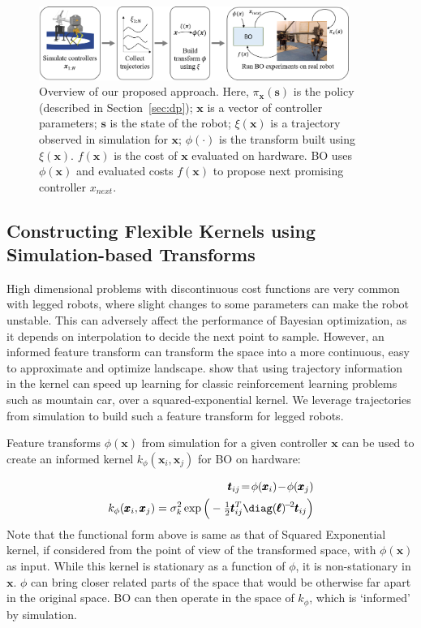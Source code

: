 \begin{figure}
    \centering
    \includegraphics[width=0.9\textwidth]{img/approach.png}
    \caption{Overview of our proposed approach. Here, $\pi_{\pmb{x}}(\pmb{s})$ is the policy (described in Section~\ref{sec:dp});  $\pmb{x}$ is a vector of controller parameters; $\pmb{s}$ is the state of the robot; $\xi(\pmb{x})$ is a trajectory observed in simulation for $\pmb{x}$; $\phi(\cdot)$ is the transform built using $\xi(\pmb{x})$. $f(\pmb{x})$ is the cost of $\pmb{x}$ evaluated on hardware. BO uses $\phi(\pmb{x})$ and evaluated costs $f(\pmb{x})$ to propose next promising controller $x_{next}$. }
    \label{fig:approach}
\end{figure}

\subsection{Constructing Flexible Kernels using Simulation-based Transforms}

High dimensional problems with discontinuous cost functions are very common with legged robots, where slight changes to some parameters can make the robot unstable. This can adversely affect the performance of Bayesian optimization, as it depends on interpolation to decide the next point to sample. However, an informed feature transform can transform the space into a more continuous, easy to approximate and optimize landscape. \cite{wilson2014using} show that using trajectory information in the kernel can speed up learning for classic reinforcement learning problems such as mountain car, over a squared-exponential kernel. We leverage trajectories from simulation to build such a feature transform for legged robots.

Feature transforms $\phi(\pmb{x})$ from simulation for a given controller $\pmb{x}$ can be used to create an informed kernel $k_{\phi}(\pmb{x}_i, \pmb{x}_j)$ for BO on hardware:

\begin{align}
    \pmb{t}_{ij} \!=\! \phi(\pmb{x}_i) \!-\! \phi(\pmb{x}_j) \\
    k_{\phi}(\pmb{x}_i, \pmb{x}_j) = \sigma_k^2 \exp\Big(- \tfrac{1}{2} \pmb{t}_{ij}^T  \diag(\pmb{\ell})^{\!-\!2} \pmb{t}_{ij} \Big)
\end{align}
Note that the functional form above is same as that of Squared Exponential kernel, if considered from the point of view of the transformed space, with $\phi(\pmb{x})$ as input. While this kernel is stationary as a function of $\phi$, it is non-stationary in $\pmb{x}$. $\phi$ can bring closer related parts of the space that would be otherwise far apart in the original space. BO can then operate in the space of $k_{\phi}$, which is `informed' by simulation.

